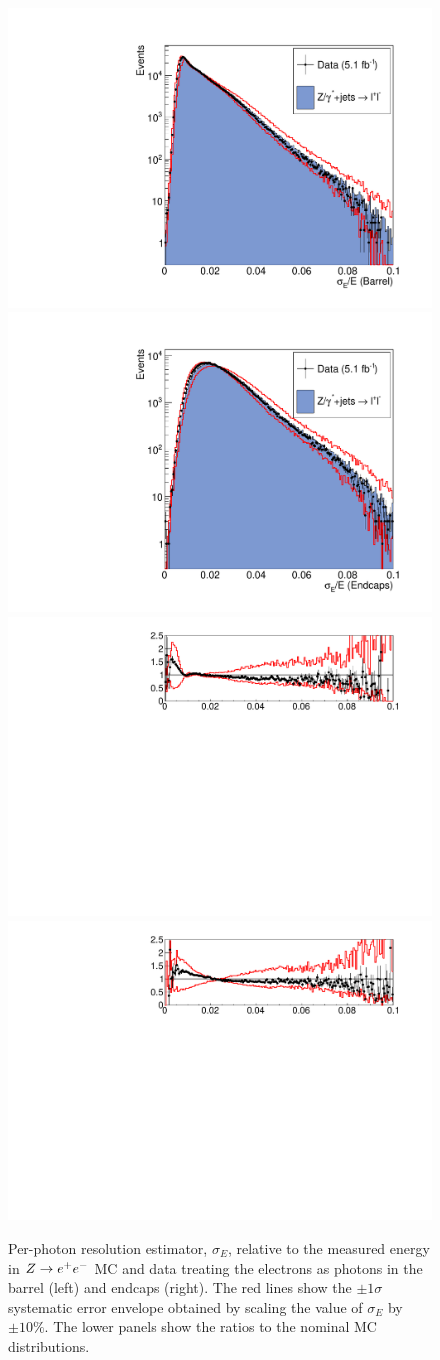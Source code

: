 \begin{figure}
  \includegraphics[width=.48\textwidth]{hgg7TeV/zeeValidation/sigmaE_EB.pdf}
  \includegraphics[width=.48\textwidth]{hgg7TeV/zeeValidation/sigmaE_EE.pdf}\\
  \includegraphics[width=.48\textwidth]{hgg7TeV/zeeValidation/sigmaE_EB_ratio.pdf}
  \includegraphics[width=.48\textwidth]{hgg7TeV/zeeValidation/sigmaE_EE_ratio.pdf}
\caption{Per-photon resolution estimator, $\sigma_{E}$, relative to the measured energy in $Z\rightarrow e^{+}e^{-}$ 
MC and data 
treating the electrons as photons in the barrel (left) and endcaps (right). 
The red lines show the $\pm 1\sigma$ systematic error envelope obtained by scaling the value of 
$\sigma_{E}$ by $\pm 10\%$. The lower panels show the ratios to the nominal MC distributions.}
\label{fig:zeevalidsigmaE}
\end{figure}

